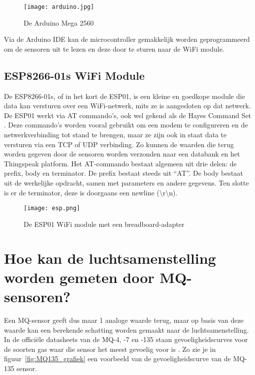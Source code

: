 \begin{figure}[h]
    \texttt{[image: arduino.jpg]}
    \caption[Arduino Mega]{De Arduino Mega 2560}
    \label{fig:arduino}
\end{figure}


Via de Arduino IDE kan de microcontroller gemakkelijk worden geprogrammeerd om de sensoren uit te lezen en deze door te sturen naar de WiFi module.

\subsection{ESP8266-01s WiFi Module}%
\label{subsec:esp01}

De ESP8266-01s, of in het kort de ESP01, is een kleine en goedkope module die data kan versturen over een WiFi-netwerk, mits ze is aangesloten op dat netwerk. De ESP01 werkt via AT commando's, ook wel gekend als de Hayes Command Set 
. Deze commando's worden vooral gebruikt om een ​​modem te configureren en de netwerkverbinding tot stand te brengen, maar ze zijn ook in staat data te versturen via een TCP of UDP verbinding. Zo kunnen de waarden die terug worden gegeven door de sensoren worden verzonden naar een databank en het Thingspeak platform.
Het AT-commando bestaat algemeen uit drie delen: de prefix, body en terminator. De prefix bestaat steeds uit ``AT''. De body bestaat uit de werkelijke opdracht, samen met parameters en andere gegevens. Ten slotte is er de terminator, deze is doorgaans een newline (\textbackslash r\textbackslash n).

\begin{figure}[h]
    \texttt{[image: esp.png]}
    \caption[ESP01 WiFi module]{De ESP01 WiFi module met een breadboard-adapter}
    \label{fig:esp}
\end{figure}



\section{Hoe kan de luchtsamenstelling worden gemeten door MQ-sensoren?}%
\label{sec:hoe-luchtsamenstelling meten}

Een MQ-sensor geeft dus maar 1 analoge waarde terug, maar op basis van deze waarde kan een berekende schatting worden gemaakt naar de luchtsamenstelling. In de officiële datasheets van de MQ-4, -7 en -135 staan gevoeligheidscurves voor de soorten gas waar die sensor het meest gevoelig voor is
. Zo zie je in figuur~\ref{fig:MQ135_grafiek} een voorbeeld van de gevoeligheidscurve van de MQ-135 sensor.

